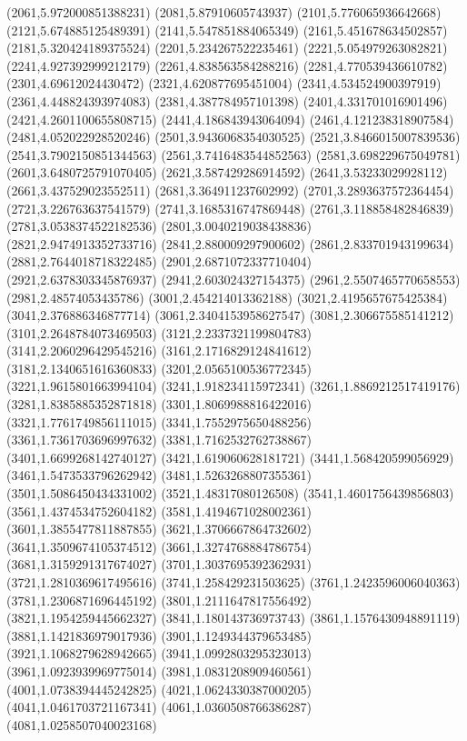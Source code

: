 {(2061,5.972000851388231)
(2081,5.87910605743937)
(2101,5.776065936642668)
(2121,5.674885125489391)
(2141,5.547851884065349)
(2161,5.451678634502857)
(2181,5.320424189375524)
(2201,5.234267522235461)
(2221,5.054979263082821)
(2241,4.927392999212179)
(2261,4.838563584288216)
(2281,4.770539436610782)
(2301,4.69612024430472)
(2321,4.620877695451004)
(2341,4.534524900397919)
(2361,4.448824393974083)
(2381,4.387784957101398)
(2401,4.331701016901496)
(2421,4.2601100655808715)
(2441,4.186843943064094)
(2461,4.121238318907584)
(2481,4.052022928520246)
(2501,3.9436068354030525)
(2521,3.8466015007839536)
(2541,3.7902150851344563)
(2561,3.7416483544852563)
(2581,3.698229675049781)
(2601,3.6480725791070405)
(2621,3.587429286914592)
(2641,3.53233029928112)
(2661,3.437529023552511)
(2681,3.364911237602992)
(2701,3.2893637572364454)
(2721,3.226763637541579)
(2741,3.1685316747869448)
(2761,3.118858482846839)
(2781,3.0538374522182536)
(2801,3.0040219038438836)
(2821,2.9474913352733716)
(2841,2.880009297900602)
(2861,2.833701943199634)
(2881,2.7644018718322485)
(2901,2.6871072337710404)
(2921,2.6378303345876937)
(2941,2.603024327154375)
(2961,2.5507465770658553)
(2981,2.48574053435786)
(3001,2.454214013362188)
(3021,2.4195657675425384)
(3041,2.376886346877714)
(3061,2.3404153958627547)
(3081,2.306675585141212)
(3101,2.2648784073469503)
(3121,2.2337321199804783)
(3141,2.2060296429545216)
(3161,2.1716829124841612)
(3181,2.1340651616360833)
(3201,2.0565100536772345)
(3221,1.9615801663994104)
(3241,1.918234115972341)
(3261,1.8869212517419176)
(3281,1.8385885352871818)
(3301,1.8069988816422016)
(3321,1.7761749856111015)
(3341,1.7552975650488256)
(3361,1.7361703696997632)
(3381,1.7162532762738867)
(3401,1.6699268142740127)
(3421,1.619060628181721)
(3441,1.568420599056929)
(3461,1.5473533796262942)
(3481,1.5263268807355361)
(3501,1.5086450434331002)
(3521,1.48317080126508)
(3541,1.4601756439856803)
(3561,1.4374534752604182)
(3581,1.4194671028002361)
(3601,1.3855477811887855)
(3621,1.3706667864732602)
(3641,1.3509674105374512)
(3661,1.3274768884786754)
(3681,1.3159291317674027)
(3701,1.3037695392362931)
(3721,1.2810369617495616)
(3741,1.258429231503625)
(3761,1.2423596006040363)
(3781,1.2306871696445192)
(3801,1.2111647817556492)
(3821,1.1954259445662327)
(3841,1.180143736973743)
(3861,1.1576430948891119)
(3881,1.1421836979017936)
(3901,1.1249344379653485)
(3921,1.1068279628942665)
(3941,1.0992803295323013)
(3961,1.0923939969775014)
(3981,1.0831208909460561)
(4001,1.0738394445242825)
(4021,1.0624330387000205)
(4041,1.0461703721167341)
(4061,1.0360508766386287)
(4081,1.0258507040023168)
}
